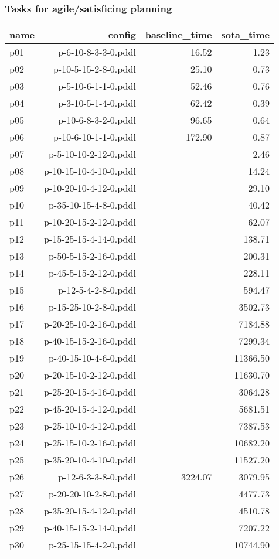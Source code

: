 \documentclass{article}
\begin{document}
                    \subsubsection*{Tasks for agile/satisficing planning}
                    
                            \begin{center}
                            \scriptsize
                            \begin{tabular}{@{}l|r|r|r@{}}
                            name & config & baseline\_time & sota\_time\\\midrule
                              p01& p-6-10-8-3-3-0.pddl&16.52&1.23\\
  p02& p-10-5-15-2-8-0.pddl&25.10&0.73\\
  p03& p-5-10-6-1-1-0.pddl&52.46&0.76\\
  p04& p-3-10-5-1-4-0.pddl&62.42&0.39\\
  p05& p-10-6-8-3-2-0.pddl&96.65&0.64\\
  p06& p-10-6-10-1-1-0.pddl&172.90&0.87\\
  p07& p-5-10-10-2-12-0.pddl&--&2.46\\
  p08& p-10-15-10-4-10-0.pddl&--&14.24\\
  p09& p-10-20-10-4-12-0.pddl&--&29.10\\
  p10& p-35-10-15-4-8-0.pddl&--&40.42\\
  p11& p-10-20-15-2-12-0.pddl&--&62.07\\
  p12& p-15-25-15-4-14-0.pddl&--&138.71\\
  p13& p-50-5-15-2-16-0.pddl&--&200.31\\
  p14& p-45-5-15-2-12-0.pddl&--&228.11\\
  p15& p-12-5-4-2-8-0.pddl&--&594.47\\
  p16& p-15-25-10-2-8-0.pddl&--&3502.73\\
  p17& p-20-25-10-2-16-0.pddl&--&7184.88\\
  p18& p-40-15-15-2-16-0.pddl&--&7299.34\\
  p19& p-40-15-10-4-6-0.pddl&--&11366.50\\
  p20& p-20-15-10-2-12-0.pddl&--&11630.70\\
  p21& p-25-20-15-4-16-0.pddl&--&3064.28\\
  p22& p-45-20-15-4-12-0.pddl&--&5681.51\\
  p23& p-25-10-10-4-12-0.pddl&--&7387.53\\
  p24& p-25-15-10-2-16-0.pddl&--&10682.20\\
  p25& p-35-20-10-4-10-0.pddl&--&11527.20\\
  p26& p-12-6-3-3-8-0.pddl&3224.07&3079.95\\
  p27& p-20-20-10-2-8-0.pddl&--&4477.73\\
  p28& p-35-20-15-4-12-0.pddl&--&4510.78\\
  p29& p-40-15-15-2-14-0.pddl&--&7207.22\\
  p30& p-25-15-15-4-2-0.pddl&--&10744.90
                            \end{tabular}
                            \end{center}
                    
\end{document}
